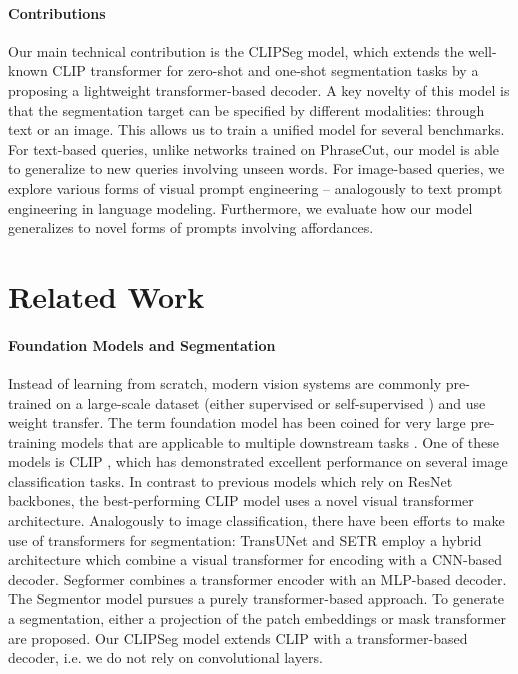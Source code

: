 \documentclass[10pt,twocolumn,letterpaper]{article}
\begin{document}
\paragraph{Contributions}

Our main technical contribution is the CLIPSeg model, which extends the well-known CLIP transformer for zero-shot and one-shot segmentation tasks by a proposing a lightweight transformer-based decoder. A key novelty of this model is that the segmentation target can be specified by different modalities: through text or an image. 
This allows us to train a unified model for several benchmarks. 
For text-based queries, unlike networks trained on PhraseCut, our model is able to generalize to new queries involving unseen words. For image-based queries, we explore various forms of visual prompt engineering -- analogously to text prompt engineering in language modeling.
Furthermore, we evaluate how our model generalizes to novel forms of prompts involving affordances.





\section{Related Work}

\paragraph{Foundation Models and Segmentation}


Instead of learning from scratch, modern vision systems are commonly pre-trained on a large-scale dataset (either supervised \cite{imagenet} or self-supervised \cite{chen20, chen21}) and use weight transfer. The term foundation model has been coined for very large pre-training models that are applicable to multiple downstream tasks \cite{bommasani21foundation}. One of these models is CLIP \cite{radford20}, which has demonstrated excellent performance on several image classification tasks. In contrast to previous models which rely on ResNet \cite{he16} backbones, the best-performing CLIP model uses a novel visual transformer \cite{dosovitskiy20} architecture.
Analogously to image classification, there have been efforts to make use of transformers for segmentation: 
\mbox{TransUNet} \cite{chen21transunet} and SETR \cite{zheng21setr} employ a hybrid architecture which combine a visual transformer for encoding with a CNN-based decoder.
Segformer \cite{xie21segformer} combines a transformer encoder with an MLP-based decoder.
The Segmentor model \cite{strudel21segmenter} pursues a purely transformer-based approach. To generate a segmentation, either a projection of the patch embeddings or mask transformer are proposed. 
Our CLIPSeg model extends CLIP with a transformer-based decoder, i.e. we do not rely on convolutional layers.
\end{document}
